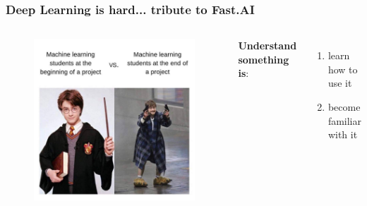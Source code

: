 \documentclass{beamer}
\begin{document}
\begin{frame}
\frametitle{Deep Learning is hard... tribute to Fast.AI}
\begin{columns}
	\begin{figure}
		\centering
		\includegraphics[height=0.9\textheight]{images/harry_ml.jpg}
	\end{figure}
	\textbf{Understand something is}:
	\begin{enumerate}
		\item learn how to use it
		\item become familiar with it
	\end{enumerate}
\end{columns}
\end{frame}
\end{document}
